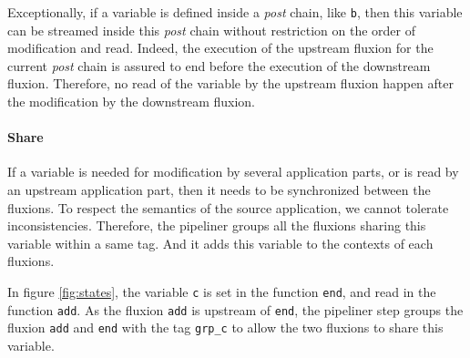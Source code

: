 Exceptionally, if a variable is defined inside a \textit{post} chain, like \texttt{b}, then this variable can be streamed inside this \textit{post} chain without restriction on the order of modification and read.
Indeed, the execution of the upstream fluxion for the current \textit{post} chain is assured to end before the execution of the downstream fluxion.
Therefore, no read of the variable by the upstream fluxion happen after the modification by the downstream fluxion.



\paragraph{Share}
If a variable is needed for modification by several application parts, or is read by an upstream application part, then it needs to be synchronized between the fluxions.
To respect the semantics of the source application, we cannot tolerate inconsistencies.
Therefore, the pipeliner groups all the fluxions sharing this variable within a same tag.
And it adds this variable to the contexts of each fluxions.

In figure \ref{fig:states}, the variable \texttt{c} is set in the function \texttt{end}, and read in the function \texttt{add}.
As the fluxion \texttt{add} is upstream of \texttt{end}, the pipeliner step groups the fluxion \texttt{add} and \texttt{end} with the tag \texttt{grp\_c} to allow the two fluxions to share this variable.




